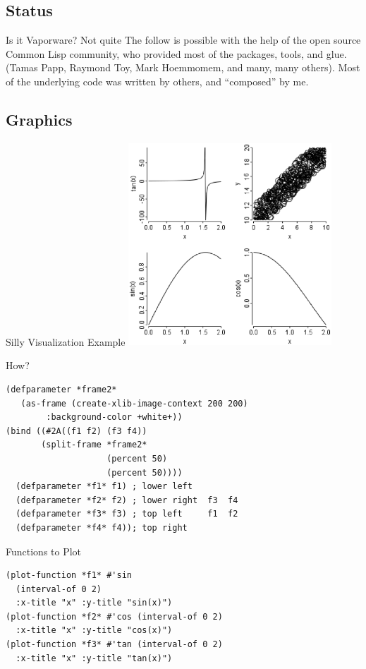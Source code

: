\documentclass{beamer}
\begin{document}
\subsection{Status}

\begin{frame}{Is it Vaporware? Not quite}
  The follow is possible with the help of the open source Common Lisp
  community, who provided most of the packages, tools, and glue.
  (Tamas Papp, Raymond Toy, Mark Hoemmomem, and many, many others).
  Most of the underlying code was written by others, and ``composed''
  by me.
\end{frame}

\subsection{Graphics}
\label{sec:work:graphics}

\begin{frame}{Silly Visualization Example}
  \includegraphics[width=3in,height=3in]{./test1.eps} %
\end{frame}

\begin{frame}[fragile]{How?}
\begin{verbatim}
(defparameter *frame2*
   (as-frame (create-xlib-image-context 200 200)
   	    :background-color +white+))
(bind ((#2A((f1 f2) (f3 f4))
       (split-frame *frame2*
                    (percent 50)
                    (percent 50))))
  (defparameter *f1* f1) ; lower left   
  (defparameter *f2* f2) ; lower right  f3  f4
  (defparameter *f3* f3) ; top left     f1  f2
  (defparameter *f4* f4)); top right
\end{verbatim}
\end{frame}

\begin{frame}[fragile]{Functions to Plot}
\begin{verbatim}
(plot-function *f1* #'sin
  (interval-of 0 2)
  :x-title "x" :y-title "sin(x)")
(plot-function *f2* #'cos (interval-of 0 2)
  :x-title "x" :y-title "cos(x)")
(plot-function *f3* #'tan (interval-of 0 2)
  :x-title "x" :y-title "tan(x)")
\end{verbatim}
\end{frame}
\end{document}
